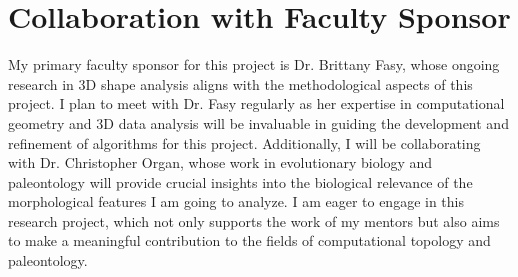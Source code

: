 \documentclass[12pt]{article}
\begin{document}
\section{Collaboration with Faculty Sponsor}
My primary faculty sponsor for this project is Dr. Brittany Fasy, whose ongoing
research in 3D shape analysis aligns with the methodological aspects of this
project. I plan to meet with Dr. Fasy regularly as her expertise in computational 
geometry and 3D data analysis will be invaluable in guiding the development and 
refinement of algorithms for this project. Additionally, I will be collaborating 
with Dr. Christopher Organ, whose work in evolutionary biology and paleontology 
will provide crucial insights into the biological relevance of the morphological 
features I am going to analyze. I am eager to engage in this research project, 
which not only supports the work of my mentors but also aims to make a meaningful 
contribution to the fields of computational topology and paleontology.

\newpage

 
\end{document}
